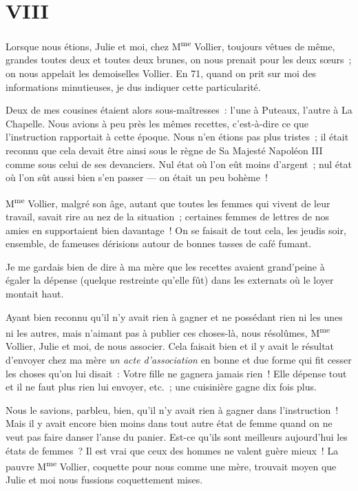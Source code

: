 \documentclass[french,twoside]{book} %
\newcommand\chapteropen{} %
\newcommand\chaptercont{} %
\begin{document}
\chapteropen
 \chapter[{VIII}]{VIII}
\label{p1.8}

\chaptercont
\noindent Lorsque nous étions, Julie et moi, chez M\textsuperscript{me} Vollier, toujours vêtues de même, grandes toutes deux et toutes deux brunes, on nous prenait pour les deux sœurs ; on nous appelait les demoiselles Vollier. En 71, quand on prit sur moi des informations minutieuses, je dus indiquer cette particularité.\par
Deux de mes cousines étaient alors sous-maîtresses : l’une à Puteaux, l’autre à La Chapelle. Nous avions à peu près les mêmes recettes, c’est-à-dire ce que l’instruction rapportait à cette époque. Nous n’en étions pas plus tristes ; il était reconnu que cela devait être ainsi sous le règne de Sa Majesté Napoléon III comme sous celui de ses devanciers. Nul état où l’on eût moins d’argent ; nul état où l’on sût aussi bien s’en passer — on était un peu bohème !\par
M\textsuperscript{me} Vollier, malgré son âge, autant que toutes les femmes qui vivent de leur travail, savait rire  au nez de la situation ; certaines femmes de lettres de nos amies en supportaient bien davantage ! On se faisait de tout cela, les jeudis soir, ensemble, de fameuses dérisions autour de bonnes tasses de café fumant.\par
Je me gardais bien de dire à ma mère que les recettes avaient grand’peine à égaler la dépense (quelque restreinte qu’elle fût) dans les externats où le loyer montait haut.\par
Ayant bien reconnu qu’il n’y avait rien à gagner et ne possédant rien ni les unes ni les autres, mais n’aimant pas à publier ces choses-là, nous résolûmes, M\textsuperscript{me} Vollier, Julie et moi, de nous associer. Cela faisait bien et il y avait le résultat d’envoyer chez ma mère \emph{un acte d’association} en bonne et due forme qui fit cesser les choses qu’on lui disait : Votre fille ne gagnera jamais rien ! Elle dépense tout et il ne faut plus rien lui envoyer, etc. ; une cuisinière gagne dix fois plus.\par
Nous le savions, parbleu, bien, qu’il n’y avait rien à gagner dans l’instruction ! Mais il y avait encore bien moins dans tout autre état de femme quand on ne veut pas faire danser l’anse du panier. Est-ce qu’ils sont meilleurs aujourd’hui les états de femmes ? Il est vrai que ceux des hommes ne valent guère mieux ! La pauvre M\textsuperscript{me} Vollier, coquette pour nous comme une mère, trouvait  moyen que Julie et moi nous fussions coquettement mises.\par
\end{document}
